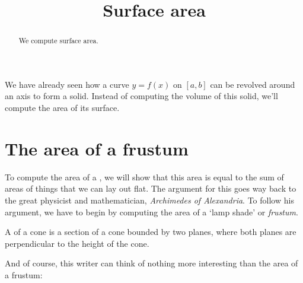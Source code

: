 \documentclass{ximera}
\title[Dig-In:]{Surface area}
\begin{document}
\begin{abstract}
We compute surface area.
\end{abstract}
\maketitle


We have already seen how a curve $y=f(x)$ on $[a,b]$ can be revolved
around an axis to form a solid. Instead of computing the volume of
this solid, we'll compute the area of its surface.

\section{The area of a frustum}

To compute the area of a , we will show
that this area is equal to the sum of areas of things that we can
lay out flat. The argument for this goes way back to the great
physicist and mathematician, \textit{Archimedes of Alexandria}. To follow his
argument, we have to begin by computing the area of a `lamp shade' or
\textit{frustum}.

\begin{definition}
  A  of a cone is a section of a cone bounded by two
  planes, where both planes are perpendicular to the height of the
  cone.
  \begin{image}[1in]
  \end{image}
\end{definition}

And of course, this writer can think of nothing more interesting than
the area of a frustum:
\end{document}
